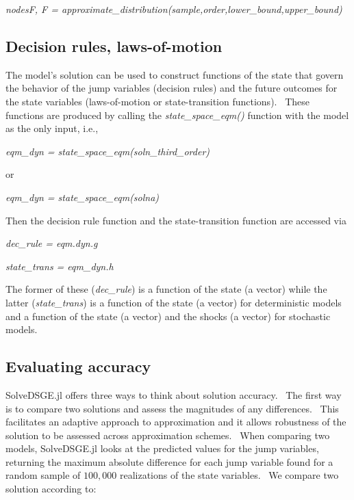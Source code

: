 \documentclass[notitlepage,11pt]{article}
\begin{document}
\bigskip

\textit{nodesF, F =
approximate\_distribution(sample,order,lower\_bound,upper\_bound)}

\bigskip

\subsection{Decision rules, laws-of-motion}

The model's solution can be used to construct functions of the state that
govern the behavior of the jump variables (decision rules) and the future
outcomes for the state variables (laws-of-motion or state-transition
functions). \ These functions are produced by calling the \textit{%
state\_space\_eqm()} function with the model as the only input, i.e.,

\bigskip

\textit{eqm\_dyn = state\_space\_eqm(soln\_third\_order)}

\bigskip

or

\bigskip

\textit{eqm\_dyn = state\_space\_eqm(solna)}

\bigskip

Then the decision rule function and the state-transition function are
accessed via

\bigskip

\textit{dec\_rule = eqm.dyn.g}

\textit{state\_trans = eqm\_dyn.h}

\bigskip

The former of these (\textit{dec\_rule}) is a function of the state (a
vector) while the latter (\textit{state\_trans}) is a function of the state
(a vector) for deterministic models and a function of the state (a vector)
and the shocks (a vector) for stochastic models.

\subsection{Evaluating accuracy}

SolveDSGE.jl offers three ways to think about solution accuracy. \ The first
way is to compare two solutions and assess the magnitudes of any
differences. \ This facilitates an adaptive approach to approximation and it
allows robustness of the solution to be assessed across approximation
schemes. \ When comparing two models, SolveDSGE.jl looks at the predicted
values for the jump variables, returning the maximum absolute difference for
each jump variable found for a random sample of $100,000$ realizations of
the state variables. \ We compare two solution according to:
\end{document}
